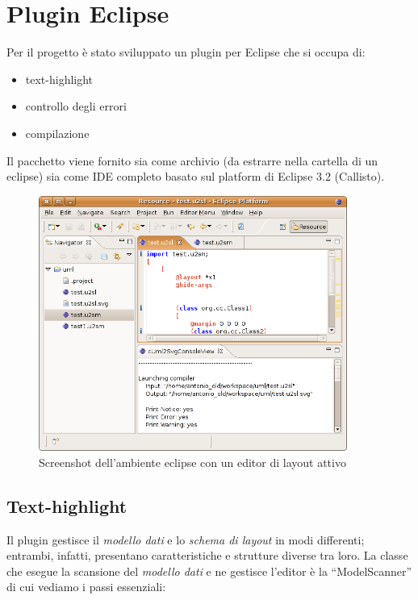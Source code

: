 \section{Plugin Eclipse}

Per il progetto è stato sviluppato un plugin per Eclipse che si occupa di:

\begin{itemize}
  \item text-highlight
  \item controllo degli errori
  \item compilazione
\end{itemize} 

Il pacchetto viene fornito sia come archivio (da estrarre nella cartella di un
eclipse) sia come IDE completo basato sul platform di Eclipse 3.2 (Callisto).

\begin{figure}[htp]
\begin{center}
  \includegraphics[width=0.9\textwidth]{img/eclipse}
  \caption[labelInTOC]{Screenshot dell'ambiente eclipse con un editor di layout
  attivo}
  \label{errorieditor} 
\end{center}
\end{figure}


\subsection{Text-highlight}
Il plugin gestisce il \emph{modello dati} e lo \emph{schema di layout} in modi differenti; 
entrambi, infatti, presentano caratteristiche e strutture diverse tra loro. 
La classe che esegue la scansione del \emph{modello dati} e ne gestisce l'editor
è la ``ModelScanner'' di cui vediamo i passi essenziali:

